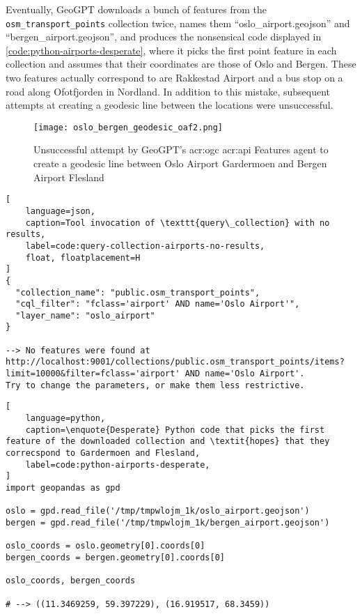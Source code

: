 Eventually, GeoGPT downloads a bunch of features from the \texttt{osm\_transport\_points} collection twice, names them \enquote{oslo\_airport.geojson} and \enquote{bergen\_airport.geojson}, and produces the nonsensical code displayed in \autoref{code:python-airports-desperate}, where it picks the first point feature in each collection and assumes that their coordinates are those of Oslo and Bergen. These two features actually correspond to are Rakkestad Airport and a bus stop on a road along Ofotfjorden in Nordland. In addition to this mistake, subsequent attempts at creating a geodesic line between the locations were unsuccessful.

\begin{figure}[htbp]
    \centering
    \texttt{[image: oslo\_bergen\_geodesic\_oaf2.png]}
    \caption{Unsuccessful attempt by GeoGPT's \acrshort{acr:ogc} \acrshort{acr:api} Features agent to create a geodesic line between Oslo Airport Gardermoen and Bergen Airport Flesland}
    \label{fig:oaf-geodesic-unsuccessful}
\end{figure}

\FloatBarrier

\begin{lstlisting}[
    language=json,
    caption=Tool invocation of \texttt{query\_collection} with no results,
    label=code:query-collection-airports-no-results,
    float, floatplacement=H
]
{
  "collection_name": "public.osm_transport_points",
  "cql_filter": "fclass='airport' AND name='Oslo Airport'",
  "layer_name": "oslo_airport"
}

--> No features were found at http://localhost:9001/collections/public.osm_transport_points/items?limit=10000&filter=fclass='airport' AND name='Oslo Airport'.
Try to change the parameters, or make them less restrictive.
\end{lstlisting}

\FloatBarrier

\begin{lstlisting}[
    language=python,
    caption=\enquote{Desperate} Python code that picks the first feature of the downloaded collection and \textit{hopes} that they correcspond to Gardermoen and Flesland,
    label=code:python-airports-desperate,
]
import geopandas as gpd

oslo = gpd.read_file('/tmp/tmpwlojm_1k/oslo_airport.geojson')
bergen = gpd.read_file('/tmp/tmpwlojm_1k/bergen_airport.geojson')

oslo_coords = oslo.geometry[0].coords[0]
bergen_coords = bergen.geometry[0].coords[0]

oslo_coords, bergen_coords   

# --> ((11.3469259, 59.397229), (16.919517, 68.3459))
\end{lstlisting}


